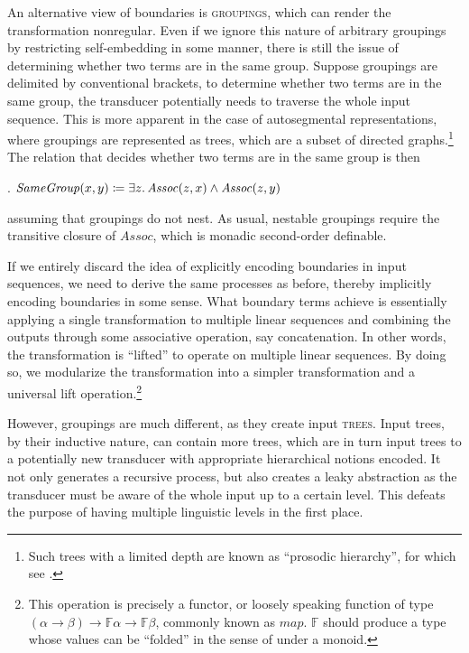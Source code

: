 \documentclass[12pt, a4paper]{report}
\newcommand{\textemph}[1]{\textsc{#1}}
\newcommand{\textterm}[1]{\textsc{#1}\index{#1}}
\begin{document}
An alternative view of boundaries is \textterm{groupings}, which can
render the transformation nonregular.  Even if we ignore this nature
of arbitrary groupings by restricting self-embedding in some manner,
there is still the issue of determining whether two terms are in the
same group.  Suppose groupings are delimited by conventional brackets,
to determine whether two terms are in the same group, the transducer
potentially needs to traverse the whole input sequence.  This is more
apparent in the case of autosegmental representations, where groupings
are represented as trees, which are a subset of directed
graphs.\footnote{Such trees with a limited depth are known as
  \enquote{prosodic hierarchy}, for which see \textcite{nv86pp}.} The
relation that decides whether two terms are in the same group is then

\ex. \(\mathit{SameGroup}(x, y) \coloneq \exists z\ldotp
\mathit{Assoc}(z, x) \land \mathit{Assoc}(z, y)\)

assuming that groupings do not nest.  As usual, nestable groupings
require the transitive closure of \(\mathit{Assoc}\), which is monadic
second-order definable.

If we entirely discard the idea of explicitly encoding boundaries in
input sequences, we need to derive the same processes as before,
thereby implicitly encoding boundaries in some sense.  What boundary
terms achieve is essentially applying a single transformation to
multiple linear sequences and combining the outputs through some
associative operation, say concatenation.  In other words, the
transformation is \enquote{lifted} to operate on multiple linear
sequences.  By doing so, we modularize the transformation into a
simpler transformation and a universal lift operation.\footnote{This
  operation is precisely a functor, or loosely speaking function of
  type
  \((\alpha \to \beta) \to \mathbb{F}\alpha \to \mathbb{F}\beta\),
  commonly known as \(\mathit{map}\).  \(\mathbb{F}\) should produce a
  type whose values can be \enquote{folded} in the sense of
  \textcite{h99tuemf} under a monoid.}

However, groupings are much different, as they create input
\textemph{trees}.  Input trees, by their inductive nature, can contain
more trees, which are in turn input trees to a potentially new
transducer with appropriate hierarchical notions encoded.  It not only
generates a recursive process, but also creates a leaky abstraction as
the transducer must be aware of the whole input up to a certain level.
This defeats the purpose of having multiple linguistic levels in the
first place.
\end{document}
